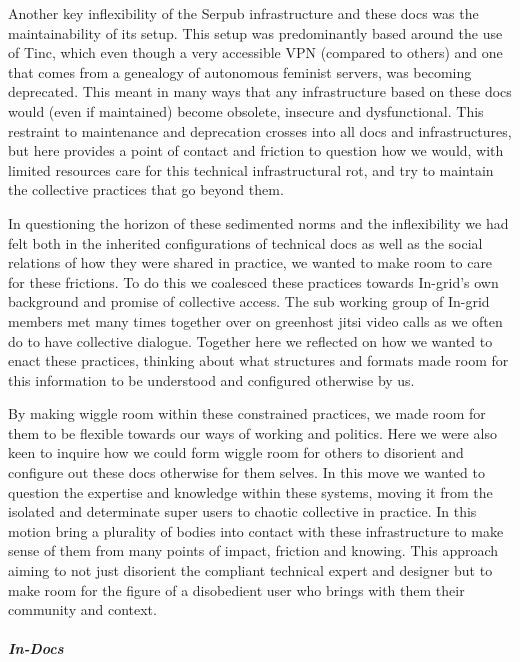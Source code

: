 Another key inflexibility of the Serpub infrastructure and these docs
was the maintainability of its setup. This setup was predominantly based
around the use of Tinc, which even though a very accessible VPN
(compared to others) and one that comes from a genealogy of autonomous
feminist servers, was becoming deprecated. This meant in many ways that
any infrastructure based on these docs would (even if maintained) become
obsolete, insecure and dysfunctional. This restraint to maintenance and
deprecation crosses into all docs and infrastructures, but here provides
a point of contact and friction to question how we would, with limited
resources care for this technical infrastructural rot, and try to
maintain the collective practices that go beyond them.

In questioning the horizon of these sedimented norms and the
inflexibility we had felt both in the inherited configurations of
technical docs as well as the social relations of how they were shared
in practice, we wanted to make room to care for these frictions. To do
this we coalesced these practices towards In-grid's own background and
promise of collective access. The sub working group of In-grid members
met many times together over on greenhost jitsi video calls as we often
do to have collective dialogue. Together here we reflected on how we
wanted to enact these practices, thinking about what structures and
formats made room for this information to be understood and configured
otherwise by us.

By making wiggle room within these constrained practices, we made room
for them to be flexible towards our ways of working and politics. Here
we were also keen to inquire how we could form wiggle room for others to
disorient and configure out these docs otherwise for them selves. In
this move we wanted to question the expertise and knowledge within these
systems, moving it from the isolated and determinate super users to
chaotic collective in practice. In this motion bring a plurality of
bodies into contact with these infrastructure to make sense of them from
many points of impact, friction and knowing. This approach aiming to not
just disorient the compliant technical expert and designer but to make
room for the figure of a disobedient user who brings with them their
community and context.

\hypertarget{in-docs}{%
\subparagraph{In-Docs}\label{in-docs}}

